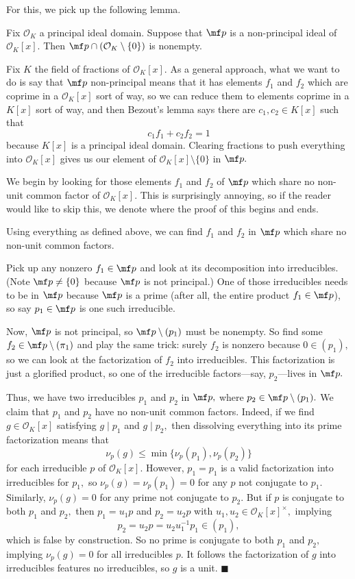 For this, we pick up the following lemma.
\begin{lemma}
    Fix $\mathcal O_K$ a principal ideal domain. Suppose that $\mf p$ is a non-principal ideal of $\mathcal O_K[x].$ Then $\mf p\cap(\mathcal O_K\setminus\{0\})$ is nonempty.
\end{lemma}
Fix $K$ the field of fractions of $\mathcal O_K[x].$ As a general approach, what we want to do is say that $\mf p$ non-principal means that it has elements $f_1$ and $f_2$ which are coprime in a $\mathcal O_K[x]$ sort of way, so we can reduce them to elements coprime in a $K[x]$ sort of way, and then Bezout's lemma says there are $c_1,c_2\in K[x]$ such that
\[c_1f_1+c_2f_2=1\]
because $K[x]$ is a principal ideal domain. Clearing fractions to push everything into $\mathcal O_K[x]$ gives us our element of $\mathcal O_K[x]\setminus\{0\}$ in $\mf p.$

We begin by looking for those elements $f_1$ and $f_2$ of $\mf p$ which share no non-unit common factor of $\mathcal O_K[x].$ This is surprisingly annoying, so if the reader would like to skip this, we denote where the proof of this begins and ends.
\begin{lemma}
    Using everything as defined above, we can find $f_1$ and $f_2$ in $\mf p$ which share no non-unit common factors.
\end{lemma}
Pick up any nonzero $f_1\in\mf p$ and look at its decomposition into irreducibles. (Note $\mf p\ne\{0\}$ because $\mf p$ is not principal.) One of those irreducibles needs to be in $\mf p$ because $\mf p$ is a prime (after all, the entire product $f_1\in\mf p$), so say $p_1\in\mf p$ is one such irreducible.

Now, $\mf p$ is not principal, so $\mf p\setminus(p_1)$ must be nonempty. So find some $f_2\in\mf p\setminus(\pi_1)$ and play the same trick: surely $f_2$ is nonzero because $0\in(p_1),$ so we can look at the factorization of $f_2$ into irreducibles. This factorization is just a glorified product, so one of the irreducible factors---say, $p_2$---lives in $\mf p.$

Thus, we have two irreducibles $p_1$ and $p_2$ in $\mf p,$ where $p_2\in\mf p\setminus(p_1).$ We claim that $p_1$ and $p_2$ have no non-unit common factors. Indeed, if we find $g\in\mathcal O_K[x]$ satisfying $g\mid p_1$ and $g\mid p_2,$ then dissolving everything into its prime factorization means that
\[\nu_p(g)\le\min\{\nu_p(p_1),\nu_p(p_2)\}\]
for each irreducible $p$ of $\mathcal O_K[x].$ However, $p_1=p_1$ is a valid factorization into irreducibles for $p_1,$ so $\nu_p(g)=\nu_p(p_1)=0$ for any $p$ not conjugate to $p_1.$ Similarly, $\nu_p(g)=0$ for any prime not conjugate to $p_2.$ But if $p$ is conjugate to both $p_1$ and $p_2,$ then $p_1=u_1p$ and $p_2=u_2p$ with $u_1,u_2\in\mathcal O_K[x]^\times,$ implying
\[p_2=u_2p=u_2u_1^{-1}p_1\in(p_1),\]
which is false by construction. So no prime is conjugate to both $p_1$ and $p_2,$ implying $\nu_p(g)=0$ for all irreducibles $p.$ It follows the factorization of $g$ into irreducibles features no irreducibles, so $g$ is a unit. $\blacksquare$

